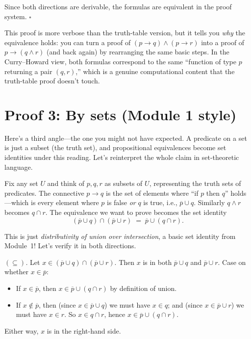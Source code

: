 \documentclass[11pt]{article}
\begin{document}
Since both directions are derivable, the formulas are equivalent in the proof system. \hfill$\square$

This proof is more verbose than the truth-table version, but it tells you \emph{why} the equivalence holds: you can turn a proof of $(p \to q) \wedge (p \to r)$ into a proof of $p \to (q \wedge r)$ (and back again) by rearranging the same basic steps. In the Curry--Howard view, both formulas correspond to the same ``function of type $p$ returning a pair $(q, r)$,'' which is a genuine computational content that the truth-table proof doesn't touch.

\section*{Proof 3: By sets (Module 1 style)}

Here's a third angle---the one you might not have expected. A predicate on a set is just a subset (the truth set), and propositional equivalences become set identities under this reading. Let's reinterpret the whole claim in set-theoretic language.

Fix any set $U$ and think of $p, q, r$ as subsets of $U$, representing the truth sets of predicates. The connective $p \to q$ is the set of elements where ``if $p$ then $q$'' holds---which is every element where $p$ is false \emph{or} $q$ is true, i.e., $\overline{p} \cup q$. Similarly $q \wedge r$ becomes $q \cap r$. The equivalence we want to prove becomes the set identity
\[
  (\overline{p} \cup q) \cap (\overline{p} \cup r) \;=\; \overline{p} \cup (q \cap r).
\]

This is just \emph{distributivity of union over intersection}, a basic set identity from Module~1! Let's verify it in both directions.

\emph{$(\subseteq)$.} Let $x \in (\overline{p} \cup q) \cap (\overline{p} \cup r)$. Then $x$ is in both $\overline{p} \cup q$ and $\overline{p} \cup r$. Case on whether $x \in \overline{p}$:
\begin{itemize}
  \item If $x \in \overline{p}$, then $x \in \overline{p} \cup (q \cap r)$ by definition of union.
  \item If $x \notin \overline{p}$, then (since $x \in \overline{p} \cup q$) we must have $x \in q$; and (since $x \in \overline{p} \cup r$) we must have $x \in r$. So $x \in q \cap r$, hence $x \in \overline{p} \cup (q \cap r)$.
\end{itemize}
Either way, $x$ is in the right-hand side.
\end{document}
